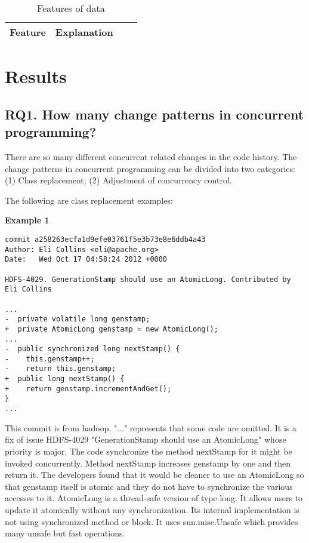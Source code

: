\documentclass[conference]{IEEEtran}
\begin{document}
\begin{table}
	\centering
	\caption{Features of data}
	\begin{tabular}{|c|c|c|c|}\hline
		Feature&Explanation\\\hline
	
	\end{tabular}
\end{table}

\section{Results}

\subsection{RQ1. How many change patterns in concurrent programming?}

There are so many different concurrent related changes in the code history. The change patterns in concurrent programming can be divided into two categories: (1) Class replacement; (2) Adjustment of concurrency control.

The following are class replacement examples:

\textbf{Example 1}
\begin{lstlisting}
commit a258263ecfa1d9efe03761f5e3b73e8e6ddb4a43
Author: Eli Collins <eli@apache.org>
Date:   Wed Oct 17 04:58:24 2012 +0000

HDFS-4029. GenerationStamp should use an AtomicLong. Contributed by Eli Collins

...
-  private volatile long genstamp;
+  private AtomicLong genstamp = new AtomicLong();
...
-  public synchronized long nextStamp() {
-    this.genstamp++;
-    return this.genstamp;
+  public long nextStamp() {
+    return genstamp.incrementAndGet();
}
...
\end{lstlisting}

This commit is from hadoop. "..." represents that some code are omitted. It is a fix of issue HDFS-4029 "GenerationStamp should use an AtomicLong" whose priority is major. The code synchronize the method nextStamp for it might be invoked concurrently. Method nextStamp increases genstamp by one and then return it. The developers found that it would be cleaner to use an AtomicLong so that genstamp itself is atomic and they do not have to synchronize the various accesses to it. AtomicLong is a thread-safe version of type long. It allows users to update it atomically without any synchronization. Its internal implementation is not using synchronized method or block. It uses sun.misc.Unsafe which provides many unsafe but fast operations.
\end{document}
